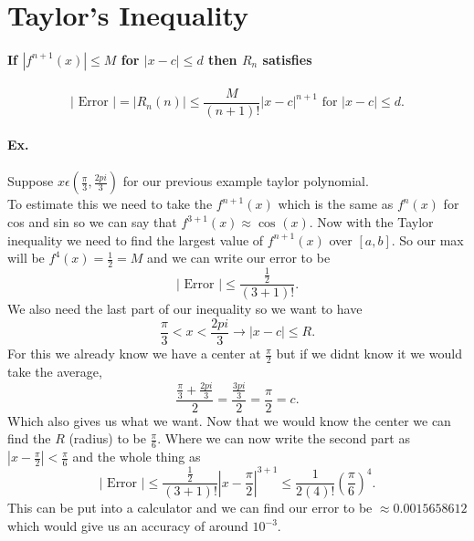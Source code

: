 \section*{Taylor's Inequality}%
\label{sec:Taylor's Inequality}
\paragraph{If $ \left| f^{ n+1 }\left( x \right)  \right|\le M $ for $ \left| x-c \right|\le d $ then $ R_n $ satisfies }
\[
\left| \text{ Error } \right|= \left| R_n\left( n \right)  \right|\le \frac{ M }{ \left( n+1 \right) ! } \left| x-c \right|^{ n+1 }\text{ for } \left| x-c \right|\le d
.\] 
\paragraph{Ex.}
Suppose $ x\epsilon\left( \frac{ \pi }{ 3 } ,\frac{ 2pi }{ 3 }  \right)  $ for our previous example taylor polynomial. \\
To estimate this we need to take the $ f^{ n+1 }\left( x \right)  $ which is the same as $ f^{ n }\left( x \right)  $ for cos and sin so we can say that $ f^{ 3+1 }\left( x \right) \approx \cos^{  } \left( x \right)  $. Now with the Taylor inequality we need to find the largest value of $ f^{ n+1 }\left( x \right)  $ over $ \left[ a,b \right]  $. So our max will be $ f^{ 4 }\left( x \right) =\frac{ 1 }{ 2 } =M $ and we can write our error to be 
\[
\left| \text{ Error } \right|\le \frac{ \frac{ 1 }{ 2 }  }{ \left( 3+1 \right) ! }
.\] 
We also need the last part of our inequality so we want to have 
\[
\frac{ \pi }{ 3 } <x<\frac{ 2pi }{ 3 } \to \left| x-c \right|\le R
.\] 
For this we already know we have a center at $ \frac{ \pi }{ 2 }  $ but if we didnt know it we would take the average,
\[
\frac{ \frac{ \pi }{ 3 } +\frac{ 2pi }{ 3 }  }{ 2 }= \frac{ \frac{ 3pi }{ 3 }  }{ 2 }=\frac{ \pi }{ 2 } =c
.\] 
Which also gives us what we want. Now that we would know the center we can find the $ R $ (radius) to be $ \frac{ \pi }{ 6 }  $. Where we can now write the second part as $ \left| x-\frac{ \pi }{ 2 }  \right|<\frac{ \pi }{ 6 }  $ and the whole thing as
\[
\left| \text{ Error } \right|\le \frac{ \frac{ 1 }{ 2 }  }{ \left( 3+1 \right) ! } \left|  x-\frac{ \pi }{ 2 } \right|^{ 3+1 }\le \frac{ 1 }{ 2\left( 4 \right) ! } \left( \frac{ \pi }{ 6 }  \right) ^{ 4 }
.\] 
This can be put into a calculator and we can find our error to be $ \approx 0.0015658612 $ which would give us an accuracy of around $ 10^{ -3 } $. 
